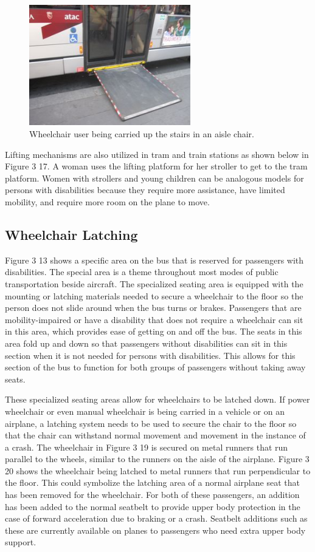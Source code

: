 \begin{figure}[h]
  \centering
     \includegraphics[width=7cm]{images/image041}
   \caption{Wheelchair user being carried up the stairs in an aisle chair.}%
  \label{fig:41}
\end{figure}

Lifting mechanisms are also utilized in tram and train stations as shown below in Figure 3 17.   A woman uses the lifting platform for her stroller to get to the tram platform. Women with strollers and young children can be analogous models for persons with disabilities because they require more assistance, have limited mobility, and require more room on the plane to move. 

\subsection{Wheelchair Latching}
Figure 3 13 shows a specific area on the bus that is reserved for passengers with disabilities.  The special area is a theme throughout most modes of public transportation beside aircraft.  The specialized seating area is equipped with the mounting or latching materials needed to secure a wheelchair to the floor so the person does not slide around when the bus turns or brakes. Passengers that are mobility-impaired or have a disability that does not require a wheelchair can sit in this area, which provides ease of getting on and off the bus. The seats in this area fold up and down so that passengers without disabilities can sit in this section when it is not needed for persons with disabilities.  This allows for this section of the bus to function for both groups of passengers without taking away seats.

These specialized seating areas allow for wheelchairs to be latched down. If power wheelchair or even manual wheelchair is being carried in a vehicle or on an airplane, a latching system needs to be used to secure the chair to the floor so that the chair can withstand normal movement and movement in the instance of a crash. The wheelchair in Figure 3 19 is secured on metal runners that run parallel to the wheels, similar to the runners on the aisle of the airplane.  Figure 3 20 shows the wheelchair being latched to metal runners that run perpendicular to the floor.  This could symbolize the latching area of a normal airplane seat that has been removed for the wheelchair. For both of these passengers, an addition has been added to the normal seatbelt to provide upper body protection in the case of forward acceleration due to braking or a crash. Seatbelt additions such as these are currently available on planes to passengers who need extra upper body support.

